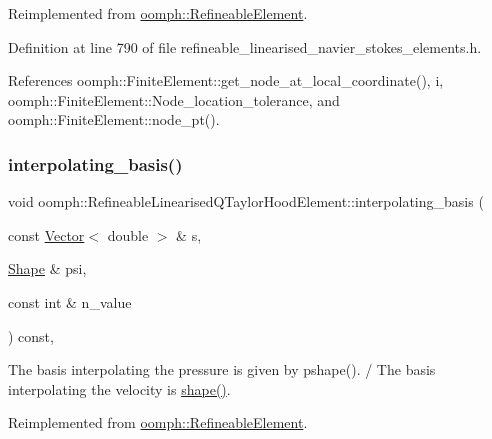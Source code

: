 Reimplemented from \hyperlink{classoomph_1_1RefineableElement_ad920e66c00888c450f926f08c7793f78}{oomph\+::\+Refineable\+Element}.



Definition at line 790 of file refineable\+\_\+linearised\+\_\+navier\+\_\+stokes\+\_\+elements.\+h.



References oomph\+::\+Finite\+Element\+::get\+\_\+node\+\_\+at\+\_\+local\+\_\+coordinate(), i, oomph\+::\+Finite\+Element\+::\+Node\+\_\+location\+\_\+tolerance, and oomph\+::\+Finite\+Element\+::node\+\_\+pt().

\mbox{\label{classoomph_1_1RefineableLinearisedQTaylorHoodElement_af968db8940e99a22734568c400fb8af2}} 
\subsubsection{\texorpdfstring{interpolating\+\_\+basis()}{interpolating\_basis()}}
{\footnotesize\ttfamily void oomph\+::\+Refineable\+Linearised\+Q\+Taylor\+Hood\+Element\+::interpolating\+\_\+basis (\begin{DoxyParamCaption}\item[{const \hyperlink{classoomph_1_1Vector}{Vector}$<$ double $>$ \&}]{s,  }\item[{\hyperlink{classoomph_1_1Shape}{Shape} \&}]{psi,  }\item[{const int \&}]{n\+\_\+value }\end{DoxyParamCaption}) const\hspace{0.3cm}{\ttfamily [inline]}, {\ttfamily [virtual]}}



The basis interpolating the pressure is given by pshape(). / The basis interpolating the velocity is \hyperlink{classoomph_1_1FiniteElement_a58a25b6859ddd43b7bfe64a19fee5023}{shape()}. 



Reimplemented from \hyperlink{classoomph_1_1RefineableElement_a8ca420443c28708e5c6315a80f520137}{oomph\+::\+Refineable\+Element}.



